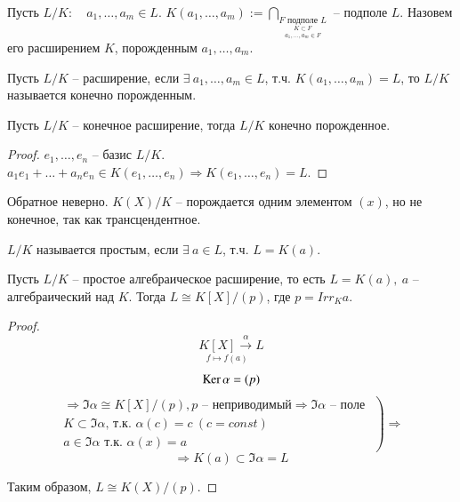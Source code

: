 \documentclass[main]{subfiles}
\begin{document}
\begin{definition}
    Пусть $L / K : \quad a_1, \ldots, a_m \in L$. 
    $K(a_1, \ldots, a_m) := \bigcap_{\underset{a_1, \ldots, a_m \in F}{\underset{K \subset F}{F \text{ подполе } L}}}
    \text{ -- подполе } L$.
    Назовем его расширением $K$, порожденным $a_1, \ldots, a_m$.
\end{definition}

\begin{definition}
    Пусть $L / K$ -- расширение, если $\exists \ a_1, \ldots, a_m \in L$, т.ч.
    $K(a_1, \ldots, a_m) = L$, то $L / K $ называется конечно порожденным.
\end{definition}

\begin{proposition}
    Пусть $L / K$ -- конечное  расширение, тогда $L / K$ конечно порожденное.
\end{proposition}

\begin{proof}
    $e_1, \ldots , e_n$ -- базис $L/K$. $a_1e_1 + \ldots + a_ne_n \in  K(e_1, \ldots, e_n)  \Rightarrow K(e_1, \ldots, e_n) = L$.
\end{proof}

\begin{remark}
    Обратное неверно. $K(X) / K$ -- порождается одним элементом $(x)$, но не конечное, так как трансцендентное.
\end{remark}

\begin{definition}
    $L / K$ называется простым, если $\exists \ a \in L$, т.ч. $L = K(a)$.
\end{definition}

\begin{proposition}
    Пусть $L / K$ -- простое алгебраическое расширение, то есть $L = K(a), \ a$ -- алгебраический над $K$.
    Тогда $L \cong K[X] / (p)$, где $p = Irr_K a$.
\end{proposition}

\begin{proof}
    \[ \underset{f \mapsto f(a)}{K[X] \stackrel{\alpha}{\longrightarrow}} L \]
    \[ \operatorname{Ker} \alpha = (p) \] 
    \[  \left. \begin{gathered}
        \Rightarrow \Im \alpha \cong K[X] / (p), p \text{ -- неприводимый} \Rightarrow \Im \alpha \text{ -- поле } \\
        K \subset \Im \alpha \text{, т.к. } \alpha(c) = c \ (c = const) \\
        a \in \Im \alpha \text{ т.к. } \alpha(x) = a
    \end{gathered} \right) \Rightarrow \]
    \[\Rightarrow K(a) \subset \Im \alpha = L \]
    
   Таким образом, $L \cong K(X)  / (p)$.
\end{proof}
\end{document}
